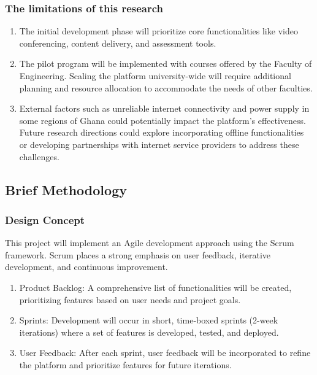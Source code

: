 \documentclass[a4paper,12pt]{article}  %
\begin{document}
\subsubsection{The limitations of this research}
\begin{enumerate}
  \item The initial development phase will prioritize core functionalities like video
        conferencing, content delivery, and assessment tools.
  \item The pilot program will be implemented with courses offered by the Faculty of
        Engineering. Scaling the platform university-wide will require additional
        planning and resource allocation to accommodate the needs of other faculties.
  \item External factors such as unreliable internet connectivity and power supply in
        some regions of Ghana could potentially impact the platform's effectiveness.
        Future research directions could explore incorporating offline functionalities
        or developing partnerships with internet service providers to address these
        challenges.
\end{enumerate}

\subsection{Brief Methodology}
\subsubsection{ Design Concept}
This project will implement an Agile development approach using the Scrum
framework. Scrum places a strong emphasis on user feedback, iterative
development, and continuous improvement.\\

\begin{enumerate}
  \item Product Backlog: A comprehensive list of functionalities will be created,
        prioritizing features based on user needs and project goals.\\
  \item Sprints: Development will occur in short, time-boxed sprints (2-week
        iterations) where a set of features is developed, tested, and deployed.\\
  \item User Feedback: After each sprint, user feedback will be incorporated to refine
        the platform and prioritize features for future iterations.\\
\end{enumerate}
\end{document}
